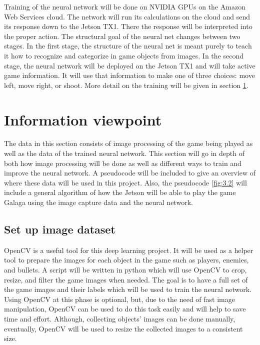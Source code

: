 \documentclass{onecolumn, draftclsnofoot,10pt, compsoc}[IEEEtran]
\begin{document}
\newline
\newline
Training of the neural network will be done on NVIDIA GPUs on the Amazon Web Services cloud.
The network will run its calculations on the cloud and send its response down to the Jetson TX1.
There the response will be interpreted into the proper action.
\newline
\newline
The structural goal of the neural net changes between two stages.
In the first stage, the structure of the neural net is meant purely to teach it how to recognize and categorize in game objects from images.
In the second stage, the neural network will be deployed on the Jetson TX1 and will take active game information.
It will use that information to make one of three choices: move left, move right, or shoot.
More detail on the training will be given in section \ref{sssec:num2}.

\section{Information viewpoint}\label{sssec:num2}%

The data in this section consists of image processing of the game being played as well as the data of the trained neural network.
This section will go in depth of both how image processing will be done as well as different ways to train and improve the neural network.
A pseudocode will be included to give an overview of where these data will be used in this project.
Also, the pseudocode \ref{fig:3.2} will include a general algorithm of how the Jetson will be able to play the game Galaga using the image capture data and the neural network.

\subsection{Set up image dataset}%

OpenCV is a useful tool for this deep learning project.
It will be used as a helper tool to prepare the images for each object in the game such as players, enemies, and bullets.
A script will be written in python which will use OpenCV to crop, resize, and filter the game images when needed.
The goal is to have a full set of the game images and their labels which will be used to train the neural network.
Using OpenCV at this phase is optional, but, due to the need of fast image manipulation, OpenCV can be used to do this task easily and will help to save time and effort.
Although, collecting objects’ images can be done manually, eventually, OpenCV will be used to resize the collected images to a consistent size.
\end{document}
